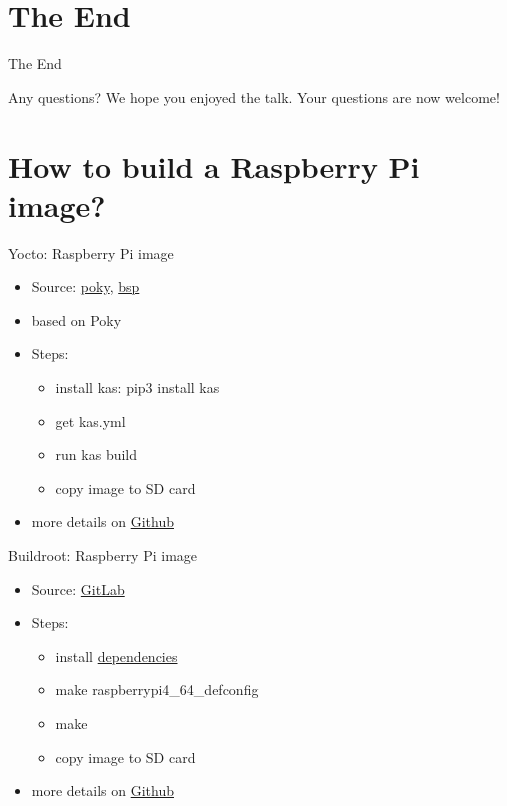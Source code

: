 \documentclass{beamer}
\begin{document}
\section{The End}

\begin{frame}{The End}
	\begin{block}{Any questions?}
		We hope you enjoyed the talk.
		Your questions are now welcome!
	\end{block}
\end{frame}


\section{How to build a Raspberry Pi image?}

\begin{frame}{Yocto: Raspberry Pi image}
	\begin{itemize}
		\item Source: \href{https://git.yoctoproject.org/poky}{poky}, \href{https://git.yoctoproject.org/meta-raspberrypi/}{bsp}
		\item based on Poky
		\item Steps:
		\begin{itemize}
			\item install kas: pip3 install kas
			\item get kas.yml
			\item run kas build
			\item copy image to SD card
		\end{itemize}
		\item more details on \href{https://github.com/tomirgang/eh21_maintainable_linux/tree/main/examples/first_build_rpi4/yocto}{Github}
	\end{itemize}
\end{frame}


\begin{frame}{Buildroot: Raspberry Pi image}
	\begin{itemize}
		\item Source: \href{https://gitlab.com/buildroot.org/buildroot/}{GitLab}
		\item Steps:
		\begin{itemize}
			\item install \href{https://buildroot.org/downloads/manual/manual.html\#requirement}{dependencies}
			\item make raspberrypi4\_64\_defconfig
			\item make
			\item copy image to SD card
		\end{itemize}
		\item more details on \href{https://github.com/tomirgang/eh21_maintainable_linux/tree/main/examples/first_build_rpi4/buildroot}{Github}
	\end{itemize}
\end{frame}
\end{document}
